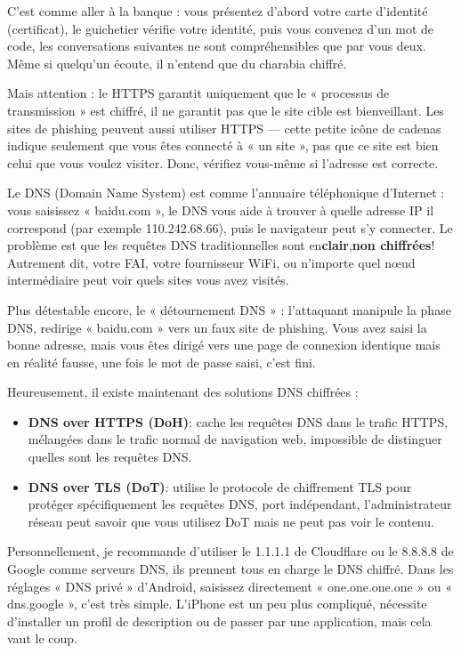 C'est comme aller à la banque : vous présentez d'abord votre carte d'identité (certificat), le guichetier vérifie votre identité, puis vous convenez d'un mot de code, les conversations suivantes ne sont compréhensibles que par vous deux. Même si quelqu'un écoute, il n'entend que du charabia chiffré.

Mais attention : le HTTPS garantit uniquement que le « processus de transmission » est chiffré, il ne garantit pas que le site cible est bienveillant. Les sites de phishing peuvent aussi utiliser HTTPS — cette petite icône de cadenas indique seulement que vous êtes connecté à « un site », pas que ce site est bien celui que vous voulez visiter. Donc, vérifiez vous-même si l'adresse est correcte.


Le DNS (Domain Name System) est comme l'annuaire téléphonique d'Internet : vous saisissez « baidu.com », le DNS vous aide à trouver à quelle adresse IP il correspond (par exemple 110.242.68.66), puis le navigateur peut s'y connecter. Le problème est que les requêtes DNS traditionnelles sont en\textbf{clair},\textbf{non chiffrées}! Autrement dit, votre FAI, votre fournisseur WiFi, ou n'importe quel nœud intermédiaire peut voir quels sites vous avez visités.

Plus détestable encore, le « détournement DNS » : l'attaquant manipule la phase DNS, redirige « baidu.com » vers un faux site de phishing. Vous avez saisi la bonne adresse, mais vous êtes dirigé vers une page de connexion identique mais en réalité fausse, une fois le mot de passe saisi, c'est fini.

Heureusement, il existe maintenant des solutions DNS chiffrées :

\begin{itemize}
  \item \textbf{DNS over HTTPS (DoH)}: cache les requêtes DNS dans le trafic HTTPS, mélangées dans le trafic normal de navigation web, impossible de distinguer quelles sont les requêtes DNS.
  \item \textbf{DNS over TLS (DoT)}: utilise le protocole de chiffrement TLS pour protéger spécifiquement les requêtes DNS, port indépendant, l'administrateur réseau peut savoir que vous utilisez DoT mais ne peut pas voir le contenu.
\end{itemize}

Personnellement, je recommande d'utiliser le 1.1.1.1 de Cloudflare ou le 8.8.8.8 de Google comme serveurs DNS, ils prennent tous en charge le DNS chiffré. Dans les réglages « DNS privé » d'Android, saisissez directement « one.one.one.one » ou « dns.google », c'est très simple. L'iPhone est un peu plus compliqué, nécessite d'installer un profil de description ou de passer par une application, mais cela vaut le coup.

